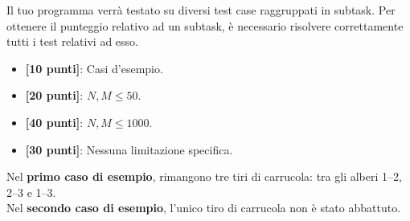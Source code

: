 \Scoring
Il tuo programma verrà testato su diversi test case raggruppati in subtask.
Per ottenere il punteggio relativo ad un subtask, è necessario risolvere
correttamente tutti i test relativi ad esso.

\begin{itemize}[nolistsep,itemsep=2mm]
  \item \textbf{ [10 punti]}: Casi d'esempio.
  \item \textbf{ [20 punti]}: $N, M \leq 50$.
  \item \textbf{ [40 punti]}: $N, M \leq 1000$.
  \item \textbf{ [30 punti]}: Nessuna limitazione specifica.
\end{itemize}



\Examples
\begin{example}
%
%
\end{example}


\Explanation
Nel \textbf{primo caso di esempio}, rimangono tre tiri di carrucola: tra gli alberi 1--2, 2--3 e 1--3.\\[2mm]
Nel \textbf{secondo caso di esempio}, l'unico tiro di carrucola non \`e stato abbattuto.

